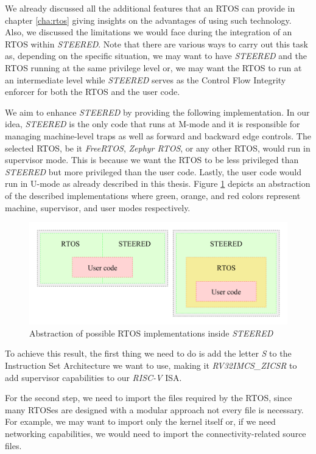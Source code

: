 We already discussed all the additional features that an RTOS can provide in chapter
\ref{cha:rtos} giving insights on the advantages of using such technology. Also,
we discussed the limitations we would face during the integration of an RTOS within
\textit{STEERED}. Note that there are various ways to carry out this task as,
depending on the specific situation, we may want to have \textit{STEERED} and
the RTOS running at the same privilege level or, we may want the RTOS to run at an
intermediate level while \textit{STEERED} serves as the Control Flow Integrity
enforcer for both the RTOS and the user code.

We aim to enhance \textit{STEERED} by providing the following implementation. In
our idea, \textit{STEERED} is the only code that runs at M-mode and it is
responsible for managing machine-level traps as well as forward and backward
edge controls. The selected RTOS, be it \textit{FreeRTOS}, \textit{Zephyr RTOS},
or any other RTOS, would run in supervisor mode. This is because we want the
RTOS to be less privileged than \textit{STEERED} but more privileged than the user
code. Lastly, the user code would run in U-mode as already described in this thesis.
Figure \ref{fig:rtos} depicts an abstraction of the described implementations
where green, orange, and red colors represent machine, supervisor, and user
modes respectively. \\
\begin{figure}[htbp]
  \centering
  \includegraphics[width=\linewidth]{images/rtos.png}
  \caption{Abstraction of possible RTOS implementations inside \textit{STEERED}}
  \label{fig:rtos}
\end{figure}

To achieve this result, the first thing we need to do is add the letter \textit{S}
to the Instruction Set Architecture we want to use, making it \textit{RV32IMCS\_ZICSR}
to add supervisor capabilities to our \textit{RISC-V} ISA.

For the second step, we need to import the files required by the RTOS, since many
RTOSes are designed with a modular approach not every file is necessary. For
example, we may want to import only the kernel itself or, if we need networking
capabilities, we would need to import the connectivity-related source files.

